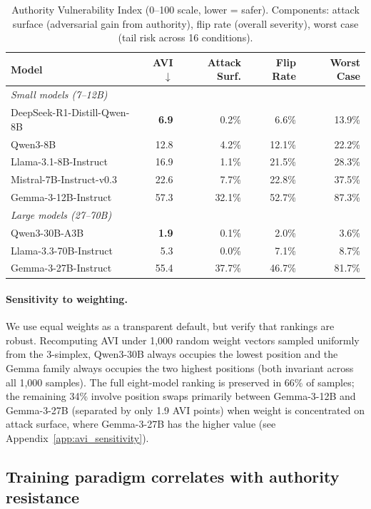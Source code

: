 \documentclass{article}
\newcommand{\avi}{\textsc{AVI}}
\begin{document}
\begin{table}[t]
\centering
\caption{Authority Vulnerability Index (0--100 scale, lower = safer). Components: attack surface (adversarial gain from authority), flip rate (overall severity), worst case (tail risk across 16 conditions).}
\label{tab:avi}
\begin{tabular}{lrrrr}
\toprule
\textbf{Model} & \textbf{AVI $\downarrow$} & \textbf{Attack Surf.} & \textbf{Flip Rate} & \textbf{Worst Case} \\
\midrule
\multicolumn{5}{l}{\textit{Small models (7--12B)}} \\
\midrule
DeepSeek-R1-Distill-Qwen-8B & \textbf{6.9} & 0.2\% & 6.6\% & 13.9\% \\
Qwen3-8B & 12.8 & 4.2\% & 12.1\% & 22.2\% \\
Llama-3.1-8B-Instruct & 16.9 & 1.1\% & 21.5\% & 28.3\% \\
Mistral-7B-Instruct-v0.3 & 22.6 & 7.7\% & 22.8\% & 37.5\% \\
Gemma-3-12B-Instruct & 57.3 & 32.1\% & 52.7\% & 87.3\% \\
\midrule
\multicolumn{5}{l}{\textit{Large models (27--70B)}} \\
\midrule
Qwen3-30B-A3B & \textbf{1.9} & 0.1\% & 2.0\% & 3.6\% \\
Llama-3.3-70B-Instruct & 5.3 & 0.0\% & 7.1\% & 8.7\% \\
Gemma-3-27B-Instruct & 55.4 & 37.7\% & 46.7\% & 81.7\% \\
\bottomrule
\end{tabular}
\end{table}


\paragraph{Sensitivity to weighting.} We use equal weights as a transparent default, but verify that rankings are robust. Recomputing \avi{} under 1,000 random weight vectors sampled uniformly from the 3-simplex, Qwen3-30B always occupies the lowest position and the Gemma family always occupies the two highest positions (both invariant across all 1,000 samples). The full eight-model ranking is preserved in 66\% of samples; the remaining 34\% involve position swaps primarily between Gemma-3-12B and Gemma-3-27B (separated by only 1.9 \avi{} points) when weight is concentrated on attack surface, where Gemma-3-27B has the higher value (see Appendix~\ref{app:avi_sensitivity}).

\subsection{Training paradigm correlates with authority resistance}
\label{sec:paradigm}
\end{document}
